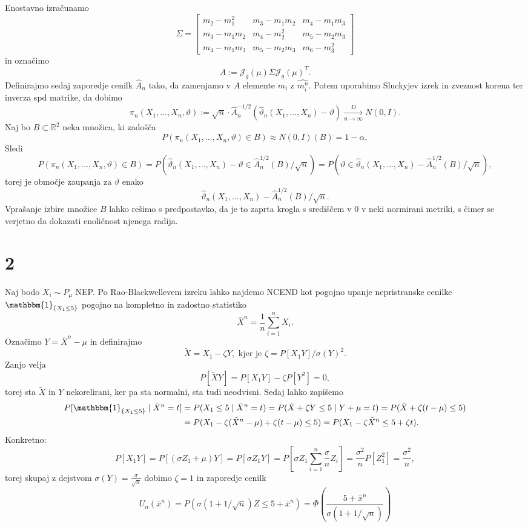 \documentclass[ letterpaper, titlepage, fleqn]{article}
\newcommand{\R}{\mathbb R}
\newcommand{\J}{\mathscr J}
\newcommand{\ind}{\mathbbm{1}}
\begin{document}
\subsection{}
Enostavno izračunamo
$$\Sigma = 
\begin{bmatrix}
m_2 - m_1^2 & m_3 - m_1m_2 & m_4 - m_1m_3 \\
m_3 - m_1m_2 & m_4 - m_2^2 & m_5 - m_2m_3 \\
m_4 - m_1m_3 & m_5 - m_2m_3 & m_6 - m_3^2 
\end{bmatrix}
$$
in označimo
$$A := \J_g(\mu) \Sigma \J_g(\mu)^T.$$
Definirajmo sedaj zaporedje cenilk $\hat{A}_n$ tako, da zamenjamo v $A$  elemente $m_i$ z $\hat{m_i^n}$.
Potem uporabimo Sluckyjev izrek in zveznost korena ter inverza spd matrike, da dobimo
$$\pi_n(X_1, \dots, X_n, \vartheta) := \sqrt{n} \cdot \hat{A}_n^{-1/2} \left(\hat{\vartheta}_n(X_1, \dots, X_n) - \vartheta\right) \xrightarrow[n\to\infty]{D} N(0, I).$$
Naj bo $B \subset \R^2$ neka množica, ki zadošča
$$P(\pi_n(X_1, \dots, X_n, \vartheta) \in B) \approx N(0,I)(B) = 1 - \alpha,$$
Sledi
$$P(\pi_n(X_1, \dots, X_n, \vartheta) \in B) = P(\hat{\vartheta}_n(X_1, \dots, X_n) - \vartheta \in \hat{A}_n^{1/2}\left(B\right) / \sqrt{n}) = P(\vartheta \in \hat{\vartheta}_n(X_1, \dots, X_n) - \hat{A}_n^{1/2}\left(B\right) / \sqrt{n}),$$
torej je območje zaupanja za $\vartheta$ enako
$$\hat{\vartheta}_n(X_1, \dots, X_n) - \hat{A}_n^{1/2}\left(B\right) / \sqrt{n}.$$
Vprašanje izbire množice $B$ lahko rešimo s predpostavko, da je to zaprta krogla s središčem v $0$ v neki normirani metriki, 
s čimer se verjetno da dokazati enoličnost njenega radija.


\section{2}
Naj bodo $X_i \sim P_\mu$ NEP. Po Rao-Blackwellevem izreku lahko najdemo NCEND kot pogojno upanje 
nepristranske cenilke $\ind_{\{X_1 \leq 5\}}$  pogojno na kompletno in zadostno statistiko
$$\bar{X}^n = \frac{1}{n} \sum_{i=1}^n X_i.$$
Označimo $Y = \bar{X}^n - \mu$ in definirajmo
$$\tilde{X} = X_1 - \zeta Y, \text{ kjer je } \zeta = P[X_1Y] / \sigma(Y)^2.$$
Zanjo velja
$$P[\tilde{X}Y] = P[X_1Y] - \zeta P[Y^2] = 0,$$
torej sta $\tilde{X}$ in $Y$ nekorelirani, ker pa sta normalni, sta tudi neodvisni. 
Sedaj lahko zapišemo
\begin{equation*}
\begin{aligned}
P[\ind_{\{X_1 \leq 5\}} \mid \bar{X}^n = t] &= P(X_1 \leq 5 \mid \bar{X}^n = t) 
= P(\tilde{X} + \zeta Y \leq 5 \mid Y + \mu = t) = P(\tilde{X} + \zeta (t - \mu) \leq 5) \\
&= P(X_1 - \zeta (\bar{X}^n - \mu) + \zeta(t - \mu) \leq 5) = P(X_1 - \zeta \bar{X}^n \leq 5 + \zeta t).
\end{aligned}
\end{equation*}
Konkretno:
$$P[X_1Y] = P[(\sigma Z_1 + \mu)Y] = P[\sigma Z_1 Y] = P[\sigma Z_1 \sum_{i=1}^n \frac{\sigma}{n} Z_i] = \frac{\sigma^2}{n} P[Z_1^2]  = \frac{\sigma^2}{n},$$
torej skupaj z dejstvom $\sigma(Y) = \frac{\sigma}{\sqrt{n}}$ dobimo $\zeta = 1$ in zaporedje cenilk
$$U_n(\bar{x}^n) = P(\sigma (1 + 1/\sqrt{n})Z \leq 5 + \bar{x}^n) = \Phi\left(\frac{5 + \bar{x}^n}{\sigma(1 + 1/\sqrt{n})}\right)$$
\end{document}
